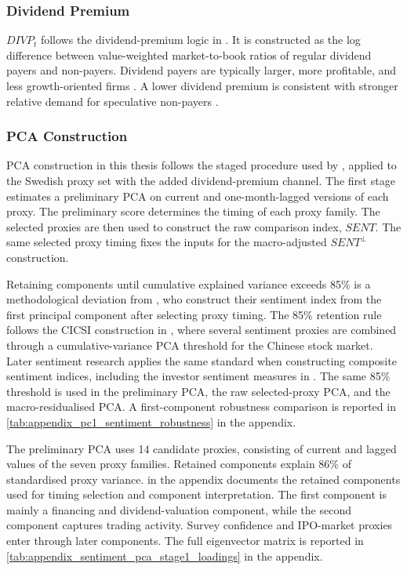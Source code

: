 \documentclass[11pt]{article}
\newcommand{\var}[1]{\ensuremath{#1}}
\begin{document}
\subsubsection{Dividend Premium}
\var{DIVP_t} follows the dividend-premium logic in \citet{baker2006sentiment}. It is constructed as the log difference between value-weighted market-to-book ratios of regular dividend payers and non-payers. Dividend payers are typically larger, more profitable, and less growth-oriented firms \citep{fama2001disappearing}. A lower dividend premium is consistent with stronger relative demand for speculative non-payers \citep{baker2004catering,baker2006sentiment}.

\subsubsection{PCA Construction}
PCA construction in this thesis follows the staged procedure used by \citet{zhang2023sweden}, applied to the Swedish proxy set with the added dividend-premium channel. The first stage estimates a preliminary PCA on current and one-month-lagged versions of each proxy. The preliminary score determines the timing of each proxy family. The selected proxies are then used to construct the raw comparison index, \var{SENT}. The same selected proxy timing fixes the inputs for the macro-adjusted \var{SENT^{\perp}} construction.

Retaining components until cumulative explained variance exceeds 85\% is a methodological deviation from \citet{baker2006sentiment}, who construct their sentiment index from the first principal component after selecting proxy timing. The 85\% retention rule follows the CICSI construction in \citet{yi2009cicsi}, where several sentiment proxies are combined through a cumulative-variance PCA threshold for the Chinese stock market. Later sentiment research applies the same standard when constructing composite sentiment indices, including the investor sentiment measures in \citet{guo2026epu}. The same 85\% threshold is used in the preliminary PCA, the raw selected-proxy PCA, and the macro-residualised PCA. A first-component robustness comparison is reported in \cref{tab:appendix_pc1_sentiment_robustness} in the appendix.

The preliminary PCA uses 14 candidate proxies, consisting of current and lagged values of the seven proxy families. Retained components explain 86\% of standardised proxy variance.  in the appendix documents the retained components used for timing selection and component interpretation. The first component is mainly a financing and dividend-valuation component, while the second component captures trading activity. Survey confidence and IPO-market proxies enter through later components. The full eigenvector matrix is reported in \cref{tab:appendix_sentiment_pca_stage1_loadings} in the appendix.
\end{document}
